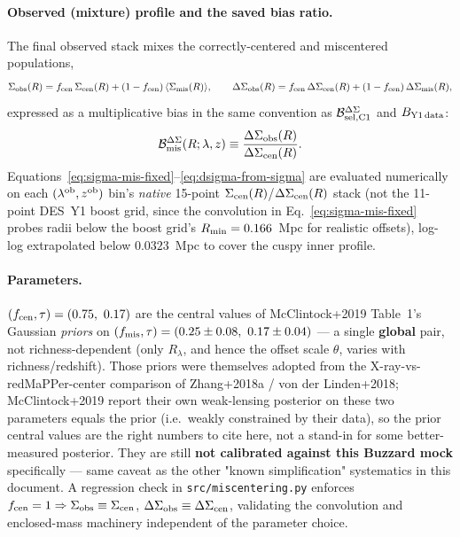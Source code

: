 \documentclass[a4paper, 11pt]{article}
\newcommand{\lob}{\lambda^{\rm ob}}
\newcommand{\zob}{z^{\rm ob}}
\newcommand{\Bmis}{\mathcal{B}_{\rm mis}}
\newcommand{\Bcal}{\mathcal{B}}
\newcommand{\pyfile}[1]{{\small\texttt{#1}}}
\begin{document}
\paragraph{Observed (mixture) profile and the saved bias ratio.} The
final observed stack mixes the correctly-centered and miscentered
populations,
\begin{equation}
\label{eq:mis-mixture}
  \Sigma_{\rm obs}(R) = f_{\rm cen}\,\Sigma_{\rm cen}(R)
    + (1 - f_{\rm cen})\,\langle\Sigma_{\rm mis}(R)\rangle,\qquad
  \Delta\Sigma_{\rm obs}(R) = f_{\rm cen}\,\Delta\Sigma_{\rm cen}(R)
    + (1 - f_{\rm cen})\,\Delta\Sigma_{\rm mis}(R),
\end{equation}
expressed as a multiplicative bias in the same convention as
$\Bcal_{\rm sel,C1}^{\Delta\Sigma}$ and $B_{\rm Y1\,data}$:
\begin{equation}
\label{eq:bmis}
  \Bmis^{\Delta\Sigma}(R;\lambda,z) \equiv
    \frac{\Delta\Sigma_{\rm obs}(R)}{\Delta\Sigma_{\rm cen}(R)}.
\end{equation}
Equations~\eqref{eq:sigma-mis-fixed}--\eqref{eq:dsigma-from-sigma} are
evaluated numerically on each $(\lob, \zob)$ bin's \emph{native}
15-point $\Sigma_{\rm cen}(R)$/$\Delta\Sigma_{\rm cen}(R)$ stack (not the
11-point DES~Y1 boost grid, since the convolution in
Eq.~\eqref{eq:sigma-mis-fixed} probes radii below the boost grid's
$R_{\rm min} = 0.166$~Mpc for realistic offsets), log-log extrapolated
below $0.0323$~Mpc to cover the cuspy inner profile.

\paragraph{Parameters.} $(f_{\rm cen}, \tau) = (0.75,\ 0.17)$ are the
central values of McClintock+2019 Table~1's Gaussian \emph{priors} on
$(f_{\rm mis}, \tau) = (0.25\pm0.08,\ 0.17\pm0.04)$ --- a single
\textbf{global} pair, not richness-dependent (only $R_\lambda$, and hence
the offset scale $\theta$, varies with richness/redshift). Those priors
were themselves adopted from the X-ray-vs-redMaPPer-center comparison of
Zhang+2018a / von der Linden+2018; McClintock+2019 report their own
weak-lensing posterior on these two parameters equals the prior (i.e.\
weakly constrained by their data), so the prior central values are the
right numbers to cite here, not a stand-in for some better-measured
posterior. They are still \textbf{not calibrated against this Buzzard
mock} specifically --- same caveat as the other "known simplification"
systematics in this document.
A regression check in \pyfile{src/miscentering.py} enforces $f_{\rm cen}
= 1 \Rightarrow \Sigma_{\rm obs} \equiv \Sigma_{\rm cen}$,
$\Delta\Sigma_{\rm obs} \equiv \Delta\Sigma_{\rm cen}$, validating the
convolution and enclosed-mass machinery independent of the parameter
choice.
\end{document}
